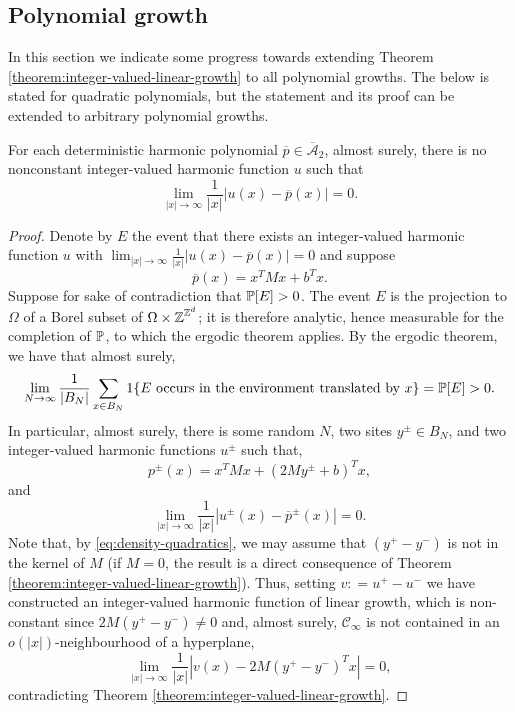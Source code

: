 \documentclass[12pt]{amsart}
\numberwithin{equation}{section}
\begin{document}
	
	
	\subsection{Polynomial growth}  \label{subsec:polynomial-growth}
	In this section we indicate some progress towards extending Theorem \ref{theorem:integer-valued-linear-growth} to all polynomial growths. The below is stated for quadratic polynomials, 
	but the statement and its proof can be extended to arbitrary polynomial growths.  
	
	
	\begin{prop} \label{prop:rational-matrix}
		For each deterministic harmonic polynomial $\overline{p} \in \overline{\mathcal{A}}_2$, almost surely, there is no nonconstant integer-valued harmonic function $u$ such that 
		\[
		\lim_{|x| \to \infty} \frac{1}{|x|}|u(x) - \overline{p}(x)| = 0.
		\]
	\end{prop}
	\begin{proof}
		Denote by $E$ the event that there exists an integer-valued harmonic function $u$ with 
		$\lim_{|x| \to \infty} \frac{1}{|x|}|u(x) - \overline{p}(x)| = 0$
		and suppose
		\[
		\overline{p}(x) = x^T  M x + b^T x.
		\]
		Suppose for sake of contradiction that $\P[E] > 0$. 
		The event $E$ is the projection to $\Omega$ of a Borel subset of $\Omega \times \Z^{\Z^d}$; it is therefore analytic, hence measurable for the completion of $\P$, to which the ergodic theorem applies. By the ergodic theorem, we have that almost surely, 
		\begin{equation} \label{eq:density-quadratics}
			\lim_{N \to \infty} \frac{1}{|B_N|} \sum_{x \in B_N} 1\{ \mbox{$E$ occurs in the environment translated by $x$} \} = \P[E] > 0.
		\end{equation}
		In particular, almost surely, there is some random $N$, two sites $y^{\pm} \in B_N$, and two integer-valued harmonic functions $u^{\pm}$
		such that, 
		\[
		p^{\pm}(x) =  x^T M x + (2 M y^{\pm} + b)^T x,
		\] 
		and
		\[
		\lim_{|x| \to \infty} \frac{1}{|x|}|u^{\pm}(x) - \overline{p}^{\pm}(x)| = 0.
		\]
		Note that, by \eqref{eq:density-quadratics}, we may assume that $(y^{+} - y^{-})$ is not in the kernel of $M$ (if $M =0$, the result is a direct consequence of Theorem \ref{theorem:integer-valued-linear-growth}). Thus, setting $v: = u^+ - u^-$ we have 
		constructed an integer-valued harmonic function of linear growth, which is non-constant since $2 M (y^+ - y^-) \neq 0$ and, almost surely, $\mathscr{C}_\infty$ is not contained in an $o(|x|)$-neighbourhood of a hyperplane, 
		\[
		\lim_{|x| \to \infty} \frac{1}{|x|} |v(x) - 2 M (y^{+} - y^-)^T x | = 0,
		\]
		contradicting Theorem \ref{theorem:integer-valued-linear-growth}.  
	\end{proof}
	
\end{document}
